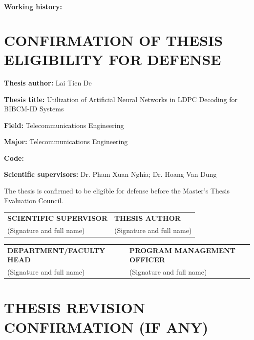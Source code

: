 \vspace{0.4cm}
\noindent\dotfill

\vspace{0.8cm}
\noindent\textbf{Working history:}

\vspace{0.4cm}
\noindent\dotfill

\vspace{0.4cm}
\noindent\dotfill

\clearpage
\chapter*{CONFIRMATION OF THESIS ELIGIBILITY FOR DEFENSE}

\noindent\textbf{Thesis author:} Lai Tien De

\noindent\textbf{Thesis title:} Utilization of Artificial Neural Networks in LDPC Decoding for BIBCM-ID Systems

\noindent\textbf{Field:} Telecommunications Engineering

\noindent\textbf{Major:} Telecommunications Engineering

\noindent\textbf{Code:} \dotfill

\noindent\textbf{Scientific supervisors:} Dr. Pham Xuan Nghia; Dr. Hoang Van Dung

\vspace{0.5cm}
\noindent The thesis is confirmed to be eligible for defense before the Master's Thesis Evaluation Council.

\vspace{1.6cm}
\noindent\begin{tabularx}{\textwidth}{>{\centering\arraybackslash}X>{\centering\arraybackslash}X}
\textbf{SCIENTIFIC SUPERVISOR} & \textbf{THESIS AUTHOR}\\[1.8cm]
(Signature and full name) & (Signature and full name)
\end{tabularx}

\vspace{1.6cm}
\noindent\begin{tabularx}{\textwidth}{>{\centering\arraybackslash}X>{\centering\arraybackslash}X}
\textbf{DEPARTMENT/FACULTY HEAD} & \textbf{PROGRAM MANAGEMENT OFFICER}\\[1.8cm]
(Signature and full name) & (Signature and full name)
\end{tabularx}

\clearpage
\chapter*{THESIS REVISION CONFIRMATION (IF ANY)}
\enlargethispage{1.5cm}

